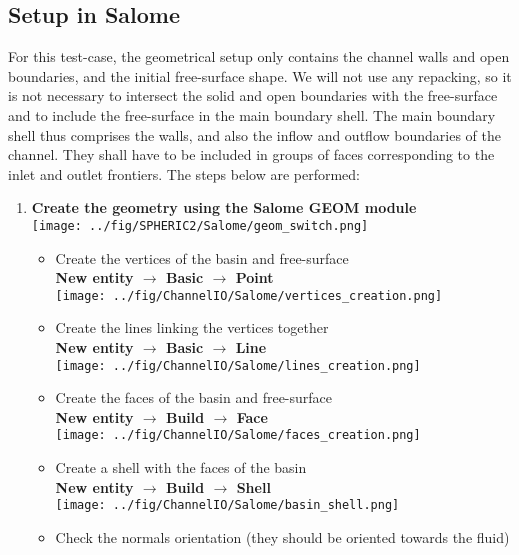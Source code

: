 \documentclass{../GPUSPHtemplate}
\begin{document}
\subsection{Setup in Salome}
For this test-case, the geometrical setup only contains the channel walls and open boundaries, and the initial free-surface shape.
We will not use any repacking, so it is not necessary to intersect the solid and open boundaries with the free-surface and to include the
free-surface in the main boundary shell.
The main boundary shell thus comprises the walls, and also the inflow and outflow boundaries of the channel.
They shall have to be included in groups of faces corresponding to the inlet and outlet frontiers.
The steps below are performed:
\begin{enumerate}
\item \textbf{Create the geometry using the Salome GEOM module}\smallskip\\
  \texttt{[image: ../fig/SPHERIC2/Salome/geom\_switch.png]}
  \begin{itemize}
  \item Create the vertices of the basin and free-surface\\
    \textbf{New entity $\to$ Basic $\to$ Point}\smallskip\\
    \texttt{[image: ../fig/ChannelIO/Salome/vertices\_creation.png]}
  \item Create the lines linking the vertices together\\
    \textbf{New entity $\to$ Basic $\to$ Line}\smallskip\\
    \texttt{[image: ../fig/ChannelIO/Salome/lines\_creation.png]}
  \item Create the faces of the basin and free-surface\\
    \textbf{New entity $\to$ Build $\to$ Face}\smallskip\\
    \texttt{[image: ../fig/ChannelIO/Salome/faces\_creation.png]}
  \item Create a shell with the faces of the basin\\
    \textbf{New entity $\to$ Build $\to$ Shell}\smallskip\\
    \texttt{[image: ../fig/ChannelIO/Salome/basin\_shell.png]}
  \item Check the normals orientation (they should be oriented towards the fluid)\\

\end{itemize}
\end{enumerate}
\end{document}
